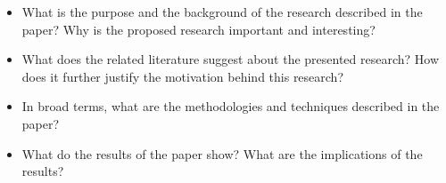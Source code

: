 \begin{itemize}
  \itemsep0in
  \item What is the purpose and the background of the research described in the paper? Why is the proposed research
    important and interesting?

  \item What does the related literature suggest about the presented research? How does it further justify the motivation
    behind this research?

  \item In broad terms, what are the methodologies and techniques described in the paper? 

  \item What do the results of the paper show? What are the implications of the results?

\end{itemize}


